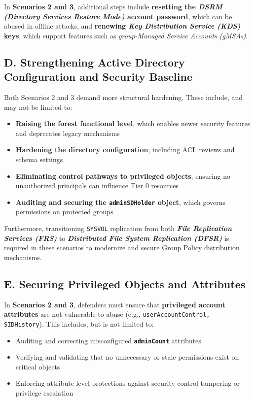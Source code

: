 In \textbf{Scenarios 2 and 3}, additional steps include \textbf{resetting the \textit{DSRM (Directory Services Restore Mode)} account password}, which can be abused in offline attacks, and \textbf{renewing \textit{Key Distribution Service (KDS)} keys}, which support features such as \textit{group-Managed Service Accounts (gMSAs)}.
    
\subsection{D. Strengthening Active Directory Configuration and Security Baseline}
Both Scenarios 2 and 3 demand more structural hardening. These include, and may not be limited to:
\begin{itemize}
    \item \textbf{Raising the forest functional level}, which enables newer security features and deprecates legacy mechanisms
    \item \textbf{Hardening the directory configuration}, including ACL reviews and schema settings
    \item \textbf{Eliminating control pathways to privileged objects}, ensuring no unauthorized principals can influence Tier 0 resources
    \item \textbf{Auditing and securing the \texttt{adminSDHolder} object}, which governs permissions on protected groups
\end{itemize}

Furthermore, transitioning \texttt{SYSVOL} replication from both \textit{\textbf{File Replication Services (FRS)}} to \textbf{\textit{Distributed File System Replication (DFSR)}} is required in these scenarios to modernize and secure Group Policy distribution mechanisms.

\subsection{E. Securing Privileged Objects and Attributes}
In \textbf{Scenarios 2 and 3}, defenders must ensure that \textbf{privileged account attributes} are not vulnerable to abuse (e.g., \texttt{userAccountControl, SIDHistory}). This includes, but is not limited to:
\begin{itemize}
    \item Auditing and correcting misconfigured \texttt{\textbf{adminCount}} attributes
    \item Verifying and validating that no unnecessary or stale permissions exist on critical objects
    \item Enforcing attribute-level protections against security control tampering or privilege escalation
\end{itemize}

